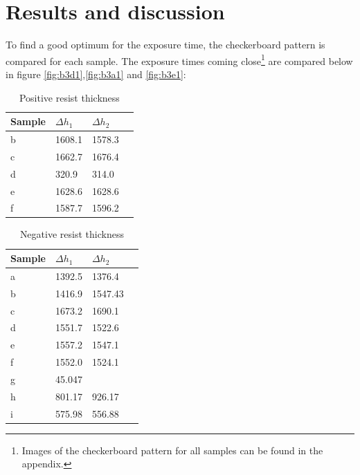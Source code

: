 \section*{Results and discussion}
To find a good optimum for the exposure time, the checkerboard pattern is compared for each sample. The exposure times coming close\footnote{Images of the checkerboard pattern for all samples can be found in the appendix.} are compared below in figure \ref{fig:b3d1},\ref{fig:b3a1} and \ref{fig:b3e1}:

\begin{table}[H]
    \centering
    \caption{Positive resist thickness}
    \begin{tabular}{X l l l}
        Sample & $\Delta h_1$ & $\Delta h_2$ \\ 
        \hline\hline
        b & 1608.1  &   1578.3  \\
        c & 1662.7  &   1676.4  \\
        d & 320.9   &   314.0   \\
        e & 1628.6  &   1628.6  \\
        f & 1587.7  &   1596.2  \\
        \hline
    \end{tabular}
    \label{tab:pos_profile}
\end{table}

\begin{table}[H]
    \centering
    \caption{Negative resist thickness}
    \begin{tabular}{X l l l}
        Sample & $\Delta h_1$ & $\Delta h_2$ \\ 
        \hline\hline
        a & 1392.5  &   1376.4  \\
        b & 1416.9  &   1547.43 \\
        c & 1673.2  &   1690.1  \\
        d & 1551.7  &   1522.6  \\
        e & 1557.2  &   1547.1  \\
        f & 1552.0  &   1524.1  \\
        g & 45.047  &   ~       \\
        h & 801.17  &   926.17  \\
        i & 575.98  &   556.88  \\
        \hline
    \end{tabular}
    \label{tab:pos_profile}
\end{table}

